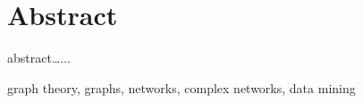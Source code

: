 \chapter*{Abstract}
{\small\indent abstract\ldots...}

\vspace{4ex}
{\small graph theory, graphs, networks, complex networks, data mining}
